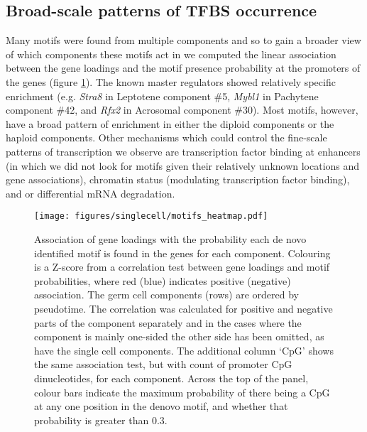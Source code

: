 \subsection{Broad-scale patterns of TFBS occurrence}
Many motifs were found from multiple components and so to gain a broader view of which components these motifs act in we computed the linear association between the gene loadings and the motif presence probability at the promoters of the genes (figure \ref{fig:motifs_heatmap}).
The known master regulators showed relatively specific enrichment (e.g. \textit{Stra8} in Leptotene component \#5, \textit{Mybl1} in Pachytene component \#42, and \textit{Rfx2} in Acrosomal component \#30).
Most motifs, however, have a broad pattern of enrichment in either the diploid components or the haploid components.
Other mechanisms which could control the fine-scale patterns of transcription we observe are transcription factor binding at enhancers (in which we did not look for motifs given their relatively unknown locations and gene associations), chromatin status (modulating transcription factor binding), and or differential mRNA degradation.

\begin{figure}[H]
	\centering
	\texttt{[image: figures/singlecell/motifs\_heatmap.pdf]}
	\caption[Motifs Heatmap]{
		Association of gene loadings with the probability each de novo identified motif is found in the genes for each component.
		Colouring is a Z-score from a correlation test between gene loadings and motif probabilities, where red (blue) indicates positive (negative) association.
		The germ cell components (rows) are ordered by pseudotime.
		The correlation was calculated for positive and negative parts of the component separately and in the cases where the component is mainly one-sided the other side has been omitted, as have the single cell components.
		The additional column ‘CpG’ shows the same association test, but with count of promoter CpG dinucleotides, for each component.
		Across the top of the panel, colour bars indicate the maximum probability of there being a CpG at any one position in the denovo motif, and whether that probability is greater than 0.3.
	}
	\label{fig:motifs_heatmap}
\end{figure}

